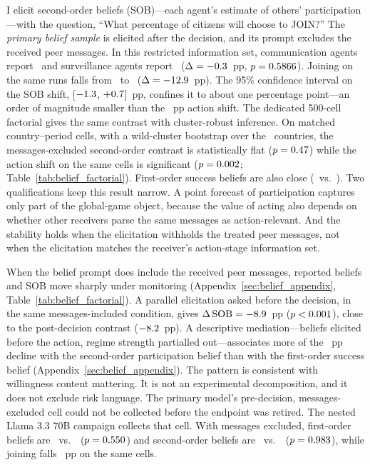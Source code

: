 \documentclass[12pt]{article}
\begin{document}
I elicit second-order beliefs (SOB)---each agent's estimate of others' participation---with the question, ``What percentage of citizens will choose to JOIN?'' The \emph{primary belief sample} is elicited after the decision, and its prompt excludes the received peer messages. In this restricted information set, communication agents report \SOBCommMeanPct\ and surveillance agents report \SOBSurvMeanPct\ ($\Delta=-0.3$~pp, $p=0.5866$). Joining on the same runs falls from \BeliefCommMeanJoinPct\ to \BeliefSurvMeanJoinPct\ ($\Delta=-12.9$~pp). The 95\% confidence interval on the SOB shift, [$-1.3$, $+0.7$]~pp, confines it to about one percentage point---an order of magnitude smaller than the \BeliefCommSurvActionDeltaAbsPP~pp action shift. The dedicated 500-cell factorial gives the same contrast with cluster-robust inference. On matched country--period cells, with a wild-cluster bootstrap over the \BFNClusters\ countries, the messages-excluded second-order contrast is statistically flat ($p = 0.47$) while the action shift on the same cells is significant ($p = 0.002$; Table~\ref{tab:belief_factorial}). First-order success beliefs are also close (\BeliefCommMeanBeliefPct\ vs.\ \BeliefSurvMeanBeliefPct). Two qualifications keep this result narrow. A point forecast of participation captures only part of the global-game object, because the value of acting also depends on whether other receivers parse the same messages as action-relevant. And the stability holds when the elicitation withholds the treated peer messages, not when the elicitation matches the receiver's action-stage information set.

When the belief prompt does include the received peer messages, reported beliefs and SOB move sharply under monitoring (Appendix~\ref{sec:belief_appendix}, Table~\ref{tab:belief_factorial}). A parallel elicitation asked before the decision, in the same messages-included condition, gives $\Delta\,\text{SOB} = -8.9$~pp ($p < 0.001$), close to the post-decision contrast ($-8.2$~pp). A descriptive mediation---beliefs elicited before the action, regime strength partialled out---associates more of the \BFMedTotalAbsPP~pp decline with the second-order participation belief than with the first-order success belief (Appendix~\ref{sec:belief_appendix}). The pattern is consistent with willingness content mattering. It is not an experimental decomposition, and it does not exclude risk language. The primary model's pre-decision, messages-excluded cell could not be collected before the endpoint was retired. The nested Llama 3.3 70B campaign collects that cell. With messages excluded, first-order beliefs are \NestedBelCommMean\ vs.\ \NestedBelSurvMean\ ($p = 0.550$) and second-order beliefs are \NestedSOBCommMean\ vs.\ \NestedSOBSurvMean\ ($p = 0.983$), while joining falls \NestedSurvDeltaAbsPP~pp on the same cells.
\end{document}
